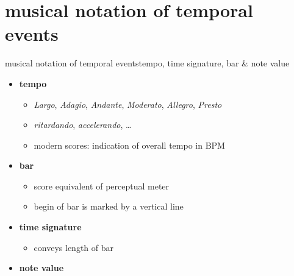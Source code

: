    \section[musical]{musical notation of temporal events}
        \begin{frame}{musical notation of temporal events}{tempo, time signature, bar \& note value}
            \begin{itemize}
                \item	\textbf{tempo}
                    \begin{itemize}
                        \item	\textsl{Largo}, \textsl{Adagio}, \textsl{Andante}, \textsl{Moderato}, \textsl{Allegro}, \textsl{Presto}
                        \pause
                        \item	\textsl{ritardando}, \textsl{accelerando}, \ldots
                        \pause
                        \item	modern scores: indication of overall tempo in \unit{BPM}
                    \end{itemize}
                \smallskip
                \item<2->	\textbf{bar}
                    \begin{itemize}
                        \item	score equivalent of perceptual meter
                        \pause
                        \item	begin of bar is marked by a vertical line
                    \end{itemize}
                \smallskip
                \item<3->	\textbf{time signature}
                    \begin{itemize}
                        \item	conveys length of bar
                    \end{itemize}
                \smallskip
                \item<4->	\textbf{note value}
            \end{itemize}
        \end{frame}
        
